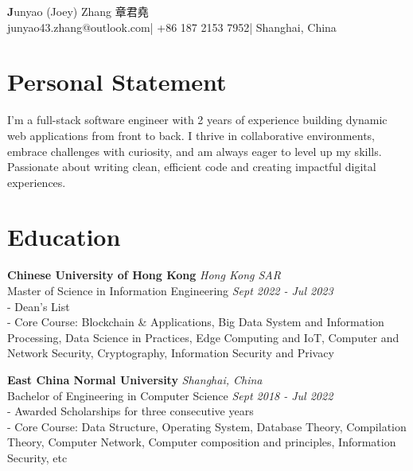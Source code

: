 \documentclass[11pt]{article}
\makeatletter
\newif\ifuniversitychinese
\newif\ifiang
\newif\ifwebthree
\newif\ifincludesalary
\newcommand{\name}{Junyao (Joey) Zhang 章君堯}
\newcommand{\name}{Junyao Zhang 章君尧}
\newcommand{\email}{junyao43.zhang@outlook.com}
\newcommand{\tel}{+86 187 2153 7952}
\makeatother
\begin{document}
\begin{center}
    {\LARGE \textbf \name}\\
    \href{mailto:you@example.com}\email \quad | \quad \tel \quad | \quad Shanghai, China
\end{center}

\vspace{0.5em}

\section*{Personal Statement}
I'm a full-stack software engineer with 2 years of experience building dynamic web applications from front to back. I thrive in collaborative environments, embrace challenges with curiosity, and am always eager to level up my skills. Passionate about writing clean, efficient code and creating impactful digital experiences.\ifwebthree{ Keen interest in blockchain technology and Web3 ecosystem.}\fi
\ifiang
    \\
    Eligible for IANG Visa to work in HK
    \fi
\ifincludesalary
    \\
    Expected Salary: HKD 30,000/month
\fi

\section*{Education}
{\fontsize{13}{13}\selectfont\textbf{Chinese University of Hong Kong}\ifuniversitychinese{(香港中文大学)}\fi} \hfill \textit{Hong Kong SAR}  \\
Master of Science in Information Engineering \hfill \textit{Sept 2022 - Jul 2023}\\[0.2em]
\ifiang
    - Eligible for IANG Visa to work in Hong Kong \\[0.2em]
\fi
- Dean's List \\[0.2em]
- Core Course: Blockchain \& Applications, Big Data System and Information Processing, Data Science in Practices, Edge Computing and IoT, Computer and Network Security, Cryptography, Information Security and Privacy

\vspace{0.7em}

{\fontsize{13}{13}\selectfont\textbf{East China Normal University}\ifuniversitychinese{(华东师范大学)}\fi} \hfill \textit{Shanghai, China}\\
Bachelor of Engineering in Computer Science \hfill \textit{Sept 2018 - Jul 2022}\\[0.2em]
- Awarded Scholarships for three consecutive years \\[0.2em]
- Core Course: Data Structure, Operating System, Database Theory, Compilation Theory, Computer Network, Computer composition and principles, Information Security, etc \\
\end{document}
